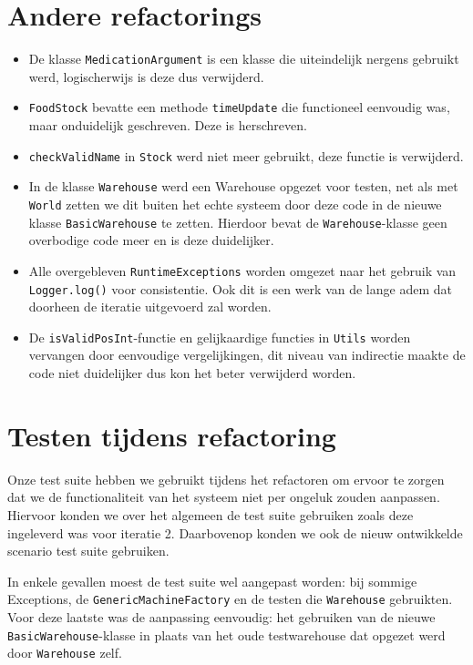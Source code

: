 \documentclass[a4paper]{article}
\begin{document}
\section{Andere refactorings}
\begin{itemize}
\item De klasse \texttt{MedicationArgument} is een klasse die uiteindelijk nergens gebruikt werd, logischerwijs is deze dus verwijderd.
\item \texttt{FoodStock} bevatte een methode \texttt{timeUpdate} die functioneel eenvoudig was, maar onduidelijk geschreven. Deze is herschreven.
\item \texttt{checkValidName} in \texttt{Stock} werd niet meer gebruikt, deze functie is verwijderd.
\item In de klasse \texttt{Warehouse} werd een Warehouse opgezet voor testen, net als met \texttt{World} zetten we dit buiten het echte systeem door deze code in de nieuwe klasse \texttt{BasicWarehouse} te zetten. Hierdoor bevat de \texttt{Warehouse}-klasse geen overbodige code meer en is deze duidelijker.
\item Alle overgebleven \texttt{RuntimeExceptions} worden omgezet naar het gebruik van \texttt{Logger.log()} voor consistentie. Ook dit is een werk van de lange adem dat doorheen de iteratie uitgevoerd zal worden.
\item De \texttt{isValidPosInt}-functie en gelijkaardige functies in \texttt{Utils} worden vervangen door eenvoudige vergelijkingen, dit niveau van indirectie maakte de code niet duidelijker dus kon het beter verwijderd worden.
\end{itemize}

\section{Testen tijdens refactoring}
Onze test suite hebben we gebruikt tijdens het refactoren om ervoor te zorgen dat we de functionaliteit van het systeem niet per ongeluk zouden aanpassen. Hiervoor konden we over het algemeen de test suite gebruiken zoals deze ingeleverd was voor iteratie 2. Daarbovenop konden we ook de nieuw ontwikkelde scenario test suite gebruiken.

In enkele gevallen moest de test suite wel aangepast worden: bij sommige Exceptions, de \texttt{GenericMachineFactory} en de testen die \texttt{Warehouse} gebruikten. Voor deze laatste was de aanpassing eenvoudig: het gebruiken van de nieuwe \texttt{BasicWarehouse}-klasse in plaats van het oude testwarehouse dat opgezet werd door \texttt{Warehouse} zelf.
\end{document}
